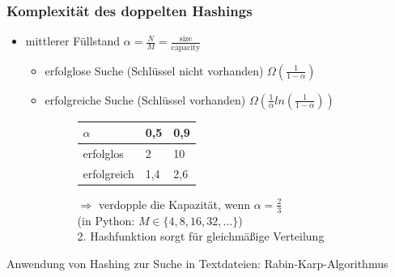 \documentclass[11pt, fleqn]{scrreprt}
\begin{document}
\subsubsection*{Komplexität des doppelten Hashings}
\begin{itemize}
    \item mittlerer Füllstand $\alpha = \frac{N}{M} = \frac{\text{size}}{\text{capacity}}$
    \begin{itemize}
        \item erfolglose Suche (Schlüssel nicht vorhanden) \hspace*{5mm}$\Omega(\frac{1}{1-\alpha})$
        \item erfolgreiche Suche (Schlüssel vorhanden) \hspace*{5mm}$\Omega(\frac{1}{\alpha} ln(\frac{1}{1-\alpha}))$
        \begin{figure}[htbp]
            \begin{minipage}[t]{7cm}
                \centering
                \vspace{0cm}
                \begin{tabular}{C{2.5cm}|C{1.3cm}|C{1.3cm}|}
                    $\alpha$ & 0,5 & 0,9 \\ \hline
                    erfolglos & 2 & 10 \\
                    erfolgreich & 1,4 & 2,6
                \end{tabular}
            \end{minipage}
            \begin{minipage}[t]{8cm}
                $\Rightarrow$ verdopple die Kapazität, wenn $\alpha = \frac{2}{3}$ \\
                (in Python: $M \in \{4, 8, 16, 32, ...\}$) \\
                2. Hashfunktion sorgt für gleichmäßige Verteilung
            \end{minipage}
        \end{figure}
    \end{itemize}
\end{itemize}
Anwendung von Hashing zur Suche in Textdateien: Rabin-Karp-Algorithmus
\end{document}
